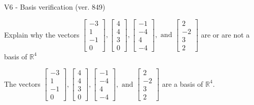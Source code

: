 \begin{exercise}
  \begin{exerciseTitle}V6 - Basis verification (ver. 849)\end{exerciseTitle}
  \begin{exerciseStatement}
    Explain why the vectors \(\left[\begin{array}{r}
-3 \\
1 \\
-1 \\
0
\end{array}\right] , \left[\begin{array}{r}
4 \\
4 \\
3 \\
0
\end{array}\right] , \left[\begin{array}{r}
-1 \\
-4 \\
4 \\
-4
\end{array}\right] , \text{ and } \left[\begin{array}{r}
2 \\
-2 \\
3 \\
2
\end{array}\right]\) are or are not a basis of \(\mathbb{R}^4\)	


  \end{exerciseStatement}
  \begin{exerciseAnswer}
   The vectors \(\left[\begin{array}{r}
-3 \\
1 \\
-1 \\
0
\end{array}\right] , \left[\begin{array}{r}
4 \\
4 \\
3 \\
0
\end{array}\right] , \left[\begin{array}{r}
-1 \\
-4 \\
4 \\
-4
\end{array}\right] , \text{ and } \left[\begin{array}{r}
2 \\
-2 \\
3 \\
2
\end{array}\right]\) 
  	 are  a basis of \(\mathbb{R}^4\).
  


  \end{exerciseAnswer}
\end{exercise}